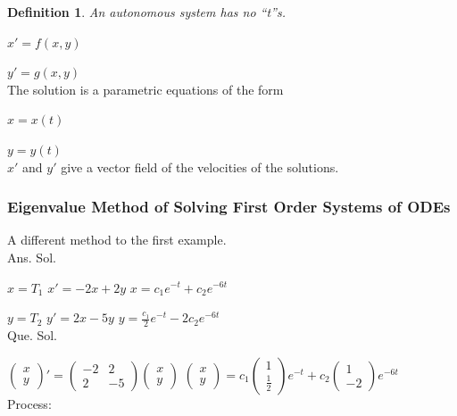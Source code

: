 \documentclass[12pt]{article}
\newtheorem{definition}{Definition}[section]
\numberwithin{equation}{subsection}
\newcommand{\indc}{\hspace{1.5cm}}
\newcommand{\indd}{\hspace{2cm}}
\newcommand{\indf}{\hspace{3cm}}
\newcommand{\indg}{\hspace{3.5cm}}
\newcommand{\indi}{\hspace{4.5cm}}
\newcommand{\indk}{\hspace{5.5cm}}
\newcommand{\indm}{\hspace{6.5cm}}
\begin{document}
\begin{definition} An autonomous system has no ``t''s.
\end{definition}

\indc $x'=f(x,y)$

\indc $y'=g(x,y)$\\

The solution is a parametric equations of the form

$x=x(t)$

$y=y(t)$\\

$x'$ and $y'$ give a vector field  of the velocities of the solutions.


\subsubsection{Eigenvalue Method of Solving First Order Systems of ODEs }

A different method to the first example.\\

\indm Ans. \indg Sol.

$x=T_1$ \indi $x'=-2x+2y$ \indd $x=c_1e^{-t}+c_2e^{-6t}$

$y=T_2$ \indi $y'=2x-5y$  \indd $y=\frac{c_1}{2}e^{-t}-2c_2e^{-6t}$\\

\indf Que.  \indk Sol.

\indd $\begin{pmatrix}
x \\
y
\end{pmatrix}'=\begin{pmatrix}
-2 & 2 \\
2 & -5
\end{pmatrix} \begin{pmatrix}
x \\
y
\end{pmatrix}$ \indd $\begin{pmatrix}
x \\
y
\end{pmatrix}=c_1\begin{pmatrix}
1 \\
\frac{1}{2}
\end{pmatrix}e^{-t}+c_2\begin{pmatrix}
1 \\
-2
\end{pmatrix}e^{-6t}$\\

Process:\\
\end{document}
